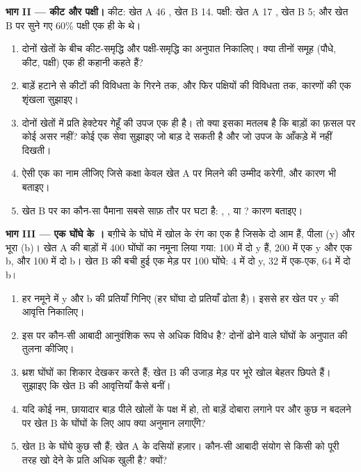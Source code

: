 \begin{problem}
\medskip
\noindent\textbf{भाग II --- कीट और पक्षी।}
कीट: खेत A 46 , खेत B 14. पक्षी: खेत A 17 , खेत B
5; और खेत B पर सुने गए 60\% पक्षी एक ही  के थे।
\begin{enumerate}[resume]
  \item दोनों खेतों के बीच कीट-समृद्धि और पक्षी-समृद्धि का अनुपात
        निकालिए। क्या तीनों समूह (पौधे, कीट, पक्षी) एक ही कहानी कहते
        हैं?
  \item बाड़ें हटाने से कीटों की विविधता के गिरने तक, और फिर पक्षियों की
        विविधता तक, कारणों की एक शृंखला सुझाइए।
  \item दोनों खेतों में प्रति हेक्टेयर गेहूँ की उपज एक ही है। तो क्या
        इसका मतलब है कि बाड़ों का फ़सल पर कोई असर नहीं? कोई एक सेवा
        सुझाइए जो बाड़ दे सकती है और जो उपज के आँकड़े में नहीं दिखती।
  \item ऐसी एक  का नाम लीजिए जिसे कक्षा केवल खेत A पर मिलने की
        उम्मीद करेगी, और कारण भी बताइए।
  \item खेत B पर  का कौन-सा पैमाना सबसे साफ़ तौर पर घटा है:
        , , या ? कारण बताइए।
\end{enumerate}

\medskip
\noindent\textbf{भाग III --- एक घोंघे के ।}
बग़ीचे के घोंघे में खोल के रंग का एक  है जिसके दो आम  हैं,
पीला (y) और भूरा (b)। खेत A की बाड़ों में 400 घोंघों का नमूना लिया गया:
100 में दो y  हैं, 200 में एक y और एक b, और 100 में दो b। खेत B
की बची हुई एक मेड़ पर 100 घोंघे: 4 में दो y, 32 में एक-एक, 64 में दो b।
\begin{enumerate}[resume]
  \item हर नमूने में y और b की प्रतियाँ गिनिए (हर घोंघा दो प्रतियाँ ढोता
        है)। इससे हर खेत पर y की आवृत्ति निकालिए।
  \item इस  पर कौन-सी आबादी आनुवंशिक रूप से अधिक विविध है? दोनों
         ढोने वाले घोंघों के अनुपात की तुलना कीजिए।
  \item थ्रश घोंघों का शिकार देखकर करते हैं; खेत B की उजाड़ मेड़ पर भूरे
        खोल बेहतर छिपते हैं। सुझाइए कि खेत B की आवृत्तियाँ कैसे बनीं।
  \item यदि कोई नम, छायादार बाड़ पीले खोलों के पक्ष में हो, तो बाड़ें
        दोबारा लगाने पर और कुछ न बदलने पर खेत B के घोंघों के लिए आप क्या
        अनुमान लगाएँगे?
  \item खेत B के घोंघे कुछ सौ हैं; खेत A के दसियों हज़ार। कौन-सी आबादी
        संयोग से किसी  को पूरी तरह खो देने के प्रति अधिक खुली है?
        क्यों?
\end{enumerate}


\end{problem}
